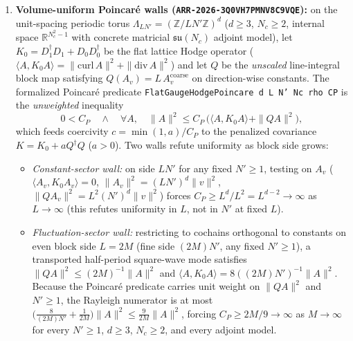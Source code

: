 \documentclass[11pt]{article}
\newcommand{\Z}{\mathbb{Z}}
\newcommand{\R}{\mathbb{R}}
\begin{document}
\begin{enumerate}
  \item \textbf{Volume-uniform Poincar\'e walls (\texttt{ARR-2026-3Q0VH7PMNV8C9VQE}):}
  on the unit-spacing periodic torus $\Lambda_{LN'} = (\Z/LN'\Z)^d$ ($d \ge 3$, $N_c \ge 2$,
  internal space $\R^{N_c^2-1}$ with concrete matricial $\mathfrak{su}(N_c)$ adjoint model),
  let $K_0 = D_1^\dagger D_1 + D_0 D_0^\dagger$ be the flat lattice Hodge operator
  ($\langle A, K_0 A\rangle = \|\mathrm{curl}\,A\|^2 + \|\mathrm{div}\,A\|^2$) and let $Q$
  be the \emph{unscaled} line-integral block map satisfying $Q(A_v) = L\,A_v^{\mathrm{coarse}}$
  on direction-wise constants. The formalized Poincar\'e predicate
  \texttt{FlatGaugeHodgePoincare d L N' Nc rho CP} is the \emph{unweighted} inequality
  \[
    0 < C_P \quad\wedge\quad
    \forall A,\quad \|A\|^2 \le C_P\,\bigl(\langle A, K_0 A\rangle + \|QA\|^2\bigr),
  \]
  which feeds coercivity $c = \min(1,a)/C_P$ to the penalized covariance
  $K = K_0 + a Q^\dagger Q$ ($a > 0$). Two walls refute uniformity as block side grows:
  \begin{itemize}
    \item \emph{Constant-sector wall:} on side $LN'$ for any fixed $N' \ge 1$, testing on
    $A_v$ ($\langle A_v, K_0 A_v\rangle = 0$, $\|A_v\|^2 = (LN')^d\|v\|^2$,
    $\|QA_v\|^2 = L^2(N')^d\|v\|^2$) forces $C_P \ge L^d/L^2 = L^{d-2} \to \infty$ as
    $L \to \infty$ (this refutes uniformity in $L$, not in $N'$ at fixed $L$).
    \item \emph{Fluctuation-sector wall:} restricting to cochains orthogonal to constants on
    even block side $L = 2M$ (fine side $(2M)N'$, any fixed $N' \ge 1$), a transported
    half-period square-wave mode satisfies $\|QA\|^2 \le (2M)^{-1}\|A\|^2$ and
    $\langle A, K_0 A\rangle = 8((2M)N')^{-1}\|A\|^2$. Because the Poincar\'e predicate carries
    unit weight on $\|QA\|^2$ and $N' \ge 1$, the Rayleigh numerator is at most
    $\bigl(\frac{8}{(2M)N'} + \frac{1}{2M}\bigr)\|A\|^2 \le \frac{9}{2M}\|A\|^2$, forcing
    $C_P \ge 2M/9 \to \infty$ as $M \to \infty$ for every $N' \ge 1$, $d \ge 3$, $N_c \ge 2$,
    and every adjoint model.
  \end{itemize}


\end{enumerate}
\end{document}
